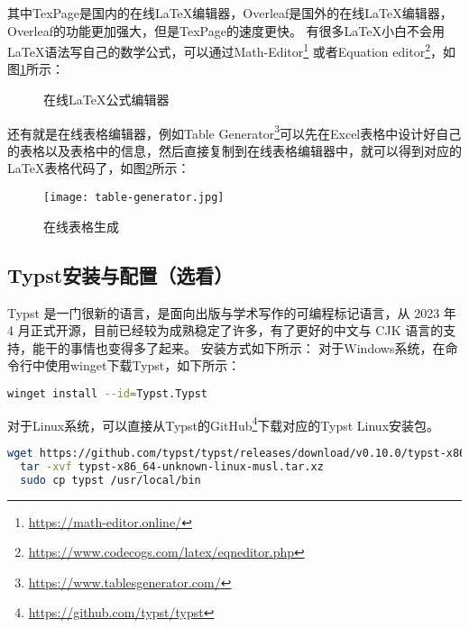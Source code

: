 \documentclass[lang=cn,a4paper,newtx]{elegantpaper}
\begin{document}
其中TexPage是国内的在线LaTeX编辑器，Overleaf是国外的在线LaTeX编辑器，Overleaf的功能更加强大，但是TexPage的速度更快。
有很多LaTeX小白不会用LaTeX语法写自己的数学公式，可以通过Math-Editor\footnote{\url{https://math-editor.online/}}
或者Equation editor\footnote{\url{https://www.codecogs.com/latex/eqneditor.php}}，如图\ref{fig:online-latex-equation-editor}所示：
\begin{figure}[hbpt]
  \caption{在线LaTeX公式编辑器}
  \label{fig:online-latex-equation-editor}
\end{figure}

还有就是在线表格编辑器，例如Table Generator\footnote{\url{https://www.tablesgenerator.com/}}可以先在Excel表格中设计好自己的表格以及表格中的信息，然后直接复制到在线表格编辑器中，就可以得到对应的LaTeX表格代码了，如图\ref{fig:online-latex-table}所示：
\begin{figure}[hbpt]
  \centering
  \texttt{[image: table-generator.jpg]}
  \caption{在线表格生成}
  \label{fig:online-latex-table}
\end{figure}

\subsection{Typst安装与配置（选看）}
Typst 是一门很新的语言，是面向出版与学术写作的可编程标记语言，从 2023 年 4 月正式开源，目前已经较为成熟稳定了许多，有了更好的中文与 CJK 语言的支持，能干的事情也变得多了起来。
安装方式如下所示：
对于Windows系统，在命令行中使用winget下载Typst，如下所示：
\begin{lstlisting}[language=bash]
  winget install --id=Typst.Typst
\end{lstlisting}

对于Linux系统，可以直接从Typst的GitHub\footnote{\url{https://github.com/typst/typst}}下载对应的Typst Linux安装包。
\begin{lstlisting}[language=bash]
  wget https://github.com/typst/typst/releases/download/v0.10.0/typst-x86_64-unknown-linux-musl.tar.xz
  tar -xvf typst-x86_64-unknown-linux-musl.tar.xz
  sudo cp typst /usr/local/bin
\end{lstlisting}
\end{document}

